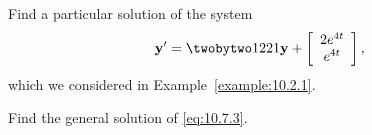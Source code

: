 \setcounter{example}{0}
\setcounter{equation}{2}
\begin{example}
  \label{example:10.7.1} \rm \mbox{}
  \newline
  \begin{alist}
    \item %
    Find a particular solution of the system
    \begin{equation}
      \label{eq:10.7.3}{\bf y}'=\twobytwo1221{\bf y}+\left[
      \begin{array}{c}
        2e^{4t} \\
        e^{4t}
      \end{array}\right],
    \end{equation}
    which we considered in Example~\ref{example:10.2.1}.

    \item %
    Find the general solution of \eqref{eq:10.7.3}.
  \end{alist}
\end{example}
\setcounter{equation}{3}
